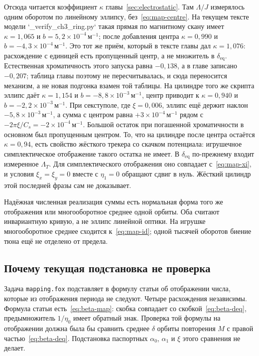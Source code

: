 Отсюда читается коэффициент $\kappa$ главы~\ref{sec:electrostatic}. Там $\Lambda/J$ измерялось одним оборотом по линейному эллипсу, без~\eqref{eq:map-centre}. На текущем тексте модели `_verify_ch3_ring.py` такая прямая по магнитному скану имеет $\kappa=1{,}065$ и $b=5{,}2\times 10^{-4}\,\mathrm{м}^{-1}$; после добавления центра $\kappa=0{,}990$ и $b=-4{,}3\times 10^{-4}\,\mathrm{м}^{-1}$. Это тот же приём, который в тексте главы дал $\kappa=1{,}076$: расхождение с единицей есть пропущенный центр, а не множитель в $\delta_{\mathrm{eq}}$. Естественная хроматичность этого запуска равна $-0{,}138$, а в главе записано $-0{,}207$; таблица главы поэтому не пересчитывалась, и сюда переносится механизм, а не новая подгонка взамен той таблицы. На цилиндре того же скрипта эллипс даёт $\kappa=1{,}154$ и $b=-8{,}8\times 10^{-3}\,\mathrm{м}^{-1}$, центр приводит к $\kappa=0{,}940$ и $b=-2{,}2\times 10^{-3}\,\mathrm{м}^{-1}$. При секступоле, где $\xi=0{,}006$, эллипс ещё держит наклон $-5{,}8\times 10^{-3}\,\mathrm{м}^{-1}$, а сумма с центром равна $+3\times 10^{-4}\,\mathrm{м}^{-1}$ рядом с $-2\pi\xi/C_s=-2\times 10^{-4}\,\mathrm{м}^{-1}$. Большой остаток при погашенной хроматичности в основном был пропущенным центром. То, что на цилиндре после центра остаётся $\kappa=0{,}94$, есть свойство жёсткого трекера со скачком потенциала: игрушечное симплектическое отображение такого остатка не имеет. В $\delta_{\mathrm{eq}}$ по-прежнему входит измеренное $\Lambda_T$. Для симплектического отображения оно совпадает с~\eqref{eq:map-xi}, и условия $\xi_x=\xi_y=0$ вместе с $\eta_1=0$ обращают сдвиг в нуль. Жёсткий цилиндр этой последней фразы сам не доказывает.

Надёжная численная реализация суммы есть нормальная форма того же отображения или многооборотное среднее одной орбиты. Оба считают инвариантную кривую, а не эллипс линейной оптики. На игрушке многооборотное среднее сходится к~\eqref{eq:map-id}; одной тысячей оборотов биение тюна ещё не отделено от предела.

\subsection{Почему текущая подстановка не проверка}
\label{sec:map-not}

Задача \texttt{mapping.fox} подставляет в формулу статьи об отображении числа, которые из отображения периода не следуют. Четыре расхождения независимы. Формула статьи есть~\eqref{eq:beta-map}: скобка совпадает со скобкой~\eqref{eq:beta-deq}, предымножитель $1/\eta_0$ имеет обратный знак. Проверка той формулы на отображении должна была бы сравнить среднее $\delta$ орбиты повторения $M$ с правой частью~\eqref{eq:beta-deq}. Подстановка паспортных $\alpha_0$, $\alpha_1$ и $\xi$ этого сравнения не делает.

